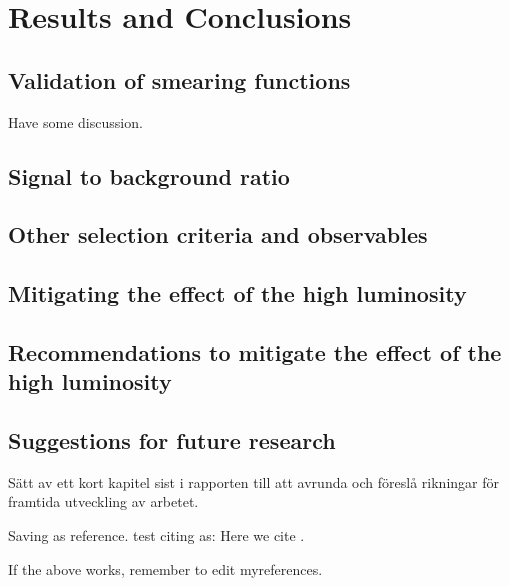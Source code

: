 \chapter{Results and Conclusions}\label{cha:res}
\section{Validation of smearing functions}
Have some discussion.
\section{Signal to background ratio}

\section{Other selection criteria and observables}
\section{Mitigating the effect of the high luminosity}

\section{Recommendations to mitigate the effect of the high luminosity}
\section{Suggestions for future research}




%
Sätt av ett kort kapitel sist i rapporten till att avrunda och föreslå rikningar för framtida utveckling av arbetet.


Saving as reference.
test citing as: Here we cite \citet{Duck:2005} \citep{Duck:2005}.

If the above works, remember to edit myreferences.
